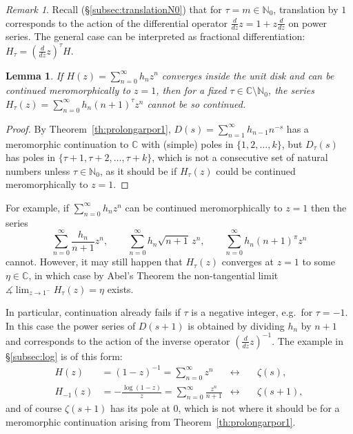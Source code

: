 \documentclass[11pt,a4paper]{amsart}
\newcommand{\N}{\mathbb{N}}
\newcommand{\C}{\mathbb{C}}
\theoremstyle{plain}
\theoremstyle{plain}
\theoremstyle{plain}
\newtheorem{lemma}{Lemma}
\theoremstyle{definition}
\theoremstyle{remark}
\newtheorem*{remark}{Remark}
\begin{document}
\begin{remark}
Recall (\S\ref{subsec:translationN0}) that for $\tau = m \in \N_{0}$, translation by $1$ corresponds to the action of the differential operator $\frac{d}{dz} z = 1 + z \frac{d}{dz}$ on power series. The general case can be interpreted as fractional differentiation: $H_{\tau} = \left(\frac{d}{dz} z\right)^{\tau} H$.
\end{remark}



\begin{lemma}
\label{lem:shifting_poles}
If $H(z) = \sum_{n=0}^{\infty} h_{n} z^{n}$ converges inside the unit disk and can be continued meromorphically to $z=1$, then for a fixed $\tau \in \C \setminus \N_{0}$, the series $H_{\tau}(z) = \sum_{n=0}^{\infty} h_{n} (n+1)^{\tau} z^{n}$ cannot be so continued.
\end{lemma}

\begin{proof}
By Theorem~\ref{th:prolongarpor1}, $D(s) = \sum_{n=1}^{\infty} h_{n-1} n^{-s}$ has a meromorphic continuation to $\C$ with (simple) poles in $\{1,2,\dots,k\}$, but $D_{\tau}(s)$ has poles in $\{\tau + 1, \tau + 2, \dots, \tau + k\}$, which is not a consecutive set of natural numbers unless $\tau \in \N_{0}$, as it should be if $H_{\tau}(z)$ could be continued meromorphically to $z=1$.
\end{proof}


For example, if $\sum_{n=0}^{\infty} h_{n} z^{n}$ can be continued meromorphically to $z=1$ then the series
\[
  \sum_{n=0}^{\infty} \frac{h_{n}}{n+1} z^{n},
  \qquad
  \sum_{n=0}^{\infty} h_{n} \sqrt{n+1} \, z^{n},
  \qquad
  \sum_{n=0}^{\infty} h_{n} (n+1)^{\pi} z^{n}
\]
cannot. However, it may still happen that $H_{\tau}(z)$ converges at $z=1$ to some $\eta \in \C$, in which case by Abel's Theorem the non-tangential limit $\measuredangle\lim_{z \to 1^{-}} H_{\tau}(z) = \eta$ exists.


In particular, continuation already fails if $\tau$ is a negative integer, e.g.\ for $\tau = -1$. In this case the power series of $D(s+1)$ is obtained by dividing $h_{n}$ by $n+1$ and corresponds to the action of the inverse operator $(\frac{d}{dz} z)^{-1}$. The example in \S\ref{subsec:log} is of this form:
\[
\begin{aligned}
  H(z) 
  &= (1-z)^{-1} = \sum_{n=0}^{\infty} z^{n} 
  &\longleftrightarrow &\quad \zeta(s),
  \\
  H_{-1}(z) 
  &= -\frac{\log(1-z)}{z} = \sum_{n=0}^{\infty} \frac{z^{n}}{n+1} 
  &\longleftrightarrow &\quad \zeta(s+1),
\end{aligned}  
\]
and of course $\zeta(s+1)$ has its pole at $0$, which is not where it should be for a meromorphic continuation arising from Theorem~\ref{th:prolongarpor1}.
\end{document}
